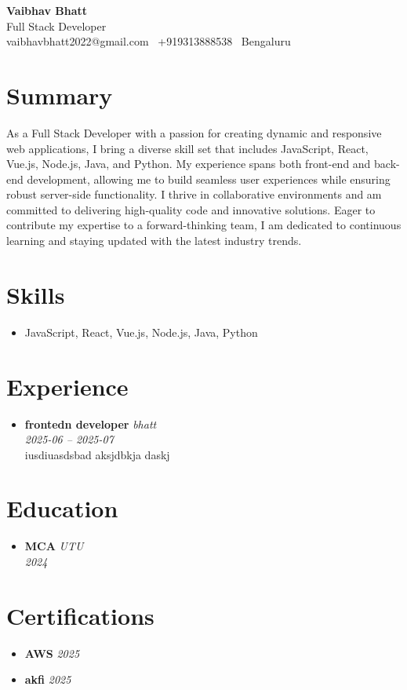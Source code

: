 \documentclass[11pt]{article}
\newcommand{\resumeHeader}[4]{
  \begin{center}
    {\Huge\sffamily\bfseries #1} \\
    \vspace{2pt}
    {\large\sffamily #2} \\
    \vspace{3pt}
    {\normalsize #3 \textbullet\ #4}
  \end{center}
}
\newcommand{\resumeSection}[1]{
  \section{#1}
}
\newcommand{\resumeItem}[4]{
  \vspace{2pt}
  \item \textbf{#1} \hfill \textit{#2} \\
  \textit{#3} \\
  #4
}
\newcommand{\resumeEduItem}[3]{
  \vspace{2pt}
  \item \textbf{#1} \hfill \textit{#2} \\
  \textit{#3}
}
\newcommand{\resumeCertItem}[2]{
  \vspace{2pt}
  \item \textbf{#1} \hfill \textit{#2}
}
\begin{document}
\resumeHeader{Vaibhav Bhatt}{Full Stack Developer}{vaibhavbhatt2022@gmail.com \textbullet\ +919313888538 \textbullet\ Bengaluru}{}


\resumeSection{Summary}
As a Full Stack Developer with a passion for creating dynamic and responsive web applications, I bring a diverse skill set that includes JavaScript, React, Vue.js, Node.js, Java, and Python. My experience spans both front-end and back-end development, allowing me to build seamless user experiences while ensuring robust server-side functionality. I thrive in collaborative environments and am committed to delivering high-quality code and innovative solutions. Eager to contribute my expertise to a forward-thinking team, I am dedicated to continuous learning and staying updated with the latest industry trends.



\resumeSection{Skills}
\begin{itemize}[nosep]
  \item JavaScript, React, Vue.js, Node.js, Java, Python
\end{itemize}



\resumeSection{Experience}
\begin{itemize}[nosep]

\resumeItem
  {frontedn developer}
  {bhatt}
  {2025-06 -- 2025-07}
  {iusdiuasdsbad aksjdbkja daskj}
      
\end{itemize}



\resumeSection{Education}
\begin{itemize}[nosep]

\resumeEduItem
  {MCA}
  {UTU}
  {2024}
      
\end{itemize}



\resumeSection{Certifications}
\begin{itemize}[nosep]

\resumeCertItem
  {AWS}
  {2025}
      
\resumeCertItem
  {akfi}
  {2025}
      
\end{itemize}
\end{document}

